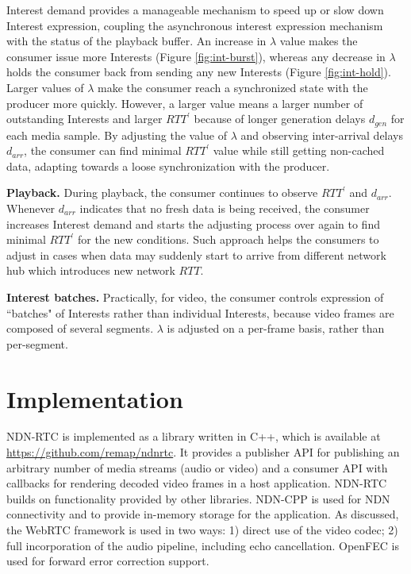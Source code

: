 \documentclass{icn/sig-alternate-2013} %
\newcommand{\ndnrtcName}{NDN-RTC} %
\newcommand{\wConcept}{Interest demand}
\begin{document}
\wConcept{} provides a manageable mechanism to speed up or slow down Interest expression, coupling the asynchronous interest expression mechanism with the status of the playback buffer. An increase in $\lambda$ value makes the consumer issue more Interests (Figure \ref{fig:int-burst}), whereas any decrease in $\lambda$ holds the consumer back from sending any new Interests (Figure \ref{fig:int-hold}). Larger values of $\lambda$ make the consumer reach a synchronized state with the producer more quickly. However, a larger value means a larger number of outstanding Interests and larger $RTT^\prime$ because of longer generation delays $d_{gen}$ for each media sample. By adjusting the value of $\lambda$ and observing inter-arrival delays $d_{arr}$, the consumer can find minimal $RTT^\prime$ value while still getting non-cached data, adapting towards a loose synchronization with the producer.

\textbf{Playback.}  During playback, the consumer continues to observe $RTT^\prime$ and $d_{arr}$. Whenever $d_{arr}$ indicates that no fresh data is being received, the consumer increases \wConcept{} and starts the adjusting process over again to find minimal $RTT^\prime$ for the new conditions. Such approach helps the consumers to adjust in cases when data may suddenly start to arrive from different network hub which introduces new network $RTT$.

\textbf{Interest batches.} Practically, for video, the consumer controls expression of ``batches" of Interests rather than individual Interests, because video frames are composed of several segments.  $\lambda$ is adjusted on a per-frame basis, rather than per-segment. 

\section{Implementation}
\label{sec:imp}
\ndnrtcName{} is implemented as a library written in C++, which is available at \url{https://github.com/remap/ndnrtc}. 
It provides a publisher API for publishing an arbitrary number of media streams (audio or video) and a consumer API with callbacks for rendering decoded video frames in a host application. \ndnrtcName{} builds on functionality provided by other libraries. NDN-CPP \cite{ndnccl} is used for NDN connectivity and to provide in-memory storage for the application. As discussed, the WebRTC framework \cite{webrtc} is used in two ways: 1) direct use of the video codec; 2) full incorporation of the audio pipeline, including echo cancellation. OpenFEC \cite{openfec} is used for forward error correction support. 
\end{document}
